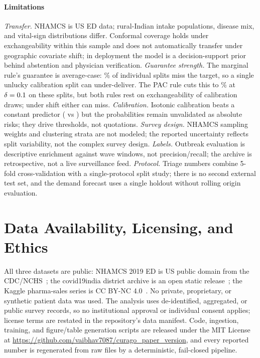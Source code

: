 \documentclass[conference]{IEEEtran}
\begin{document}
\paragraph{Limitations}
\emph{Transfer.} NHAMCS is US ED data; rural-Indian intake populations,
disease mix, and vital-sign distributions differ. Conformal coverage holds
under exchangeability within this sample and does not automatically transfer
under geographic covariate shift; in deployment the model is a
decision-support prior behind abstention and physician verification.
\emph{Guarantee strength.} The marginal rule's guarantee is average-case:
\CBelowPct\% of individual splits miss the target, so a single unlucky
calibration split can under-deliver. The PAC rule cuts this to
\PacBelowPct\% at $\delta=0.1$ on these splits, but both rules rest on
exchangeability of calibration draws; under shift either can miss.
\emph{Calibration.} Isotonic calibration beats a constant predictor
(\CalBrier{} vs \BrierConst{}) but the probabilities remain unvalidated as
absolute risks; they drive thresholds, not quotations.
\emph{Survey design.} NHAMCS sampling weights and clustering strata are not
modeled; the reported uncertainty reflects split variability, not the
complex survey design.
\emph{Labels.} Outbreak evaluation is descriptive enrichment against wave
windows, not precision/recall; the archive is retrospective, not a live
surveillance feed.
\emph{Protocol.} Triage numbers combine 5-fold cross-validation with a
single-protocol split study; there is no second external test set, and the
demand forecast uses a single holdout without rolling origin evaluation.

\section{Data Availability, Licensing, and Ethics}
\label{sec:availability}

All three datasets are public: NHAMCS 2019 ED is US public domain from the
CDC/NCHS~\cite{nhamcs2019}; the covid19india district archive is an open
static release~\cite{covid19india2023}; the Kaggle pharma-sales series is CC
BY-NC 4.0~\cite{zdravkovic2019pharma}. No private, proprietary, or synthetic
patient data was used. The analysis uses de-identified, aggregated, or
public survey records, so no institutional approval or individual consent
applies; license terms are restated in the repository's data manifest. Code,
ingestion, training, and figure/table generation scripts are released under
the MIT License at \url{https://github.com/vaibhav7087/curago_paper_version},
and every reported number is regenerated from raw files by a deterministic,
fail-closed pipeline.
\end{document}
